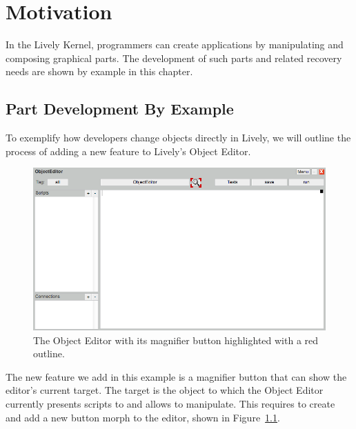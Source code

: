 \chapter{Motivation} \label{chapter:MOTIVATION}

In the Lively Kernel, programmers can create applications by manipulating and composing graphical parts.
The development of such parts and related recovery needs are shown by example in this chapter.

\section{Part Development By Example}

To exemplify how developers change objects directly in Lively, we will outline the process of adding a new feature to Lively's Object Editor.

\begin{figure}[h]
    \centering
    \includegraphics[width=\textwidth]{figures/3_motivation/1_magnifierButton.png}
    \caption{The Object Editor with its magnifier button highlighted with a red outline.}
    \label{fig:MagnifierButton}
\end{figure}

The new feature we add in this example is a magnifier button that can show the editor's current target.
The target is the object to which the Object Editor currently presents scripts to and allows to manipulate.
This requires to create and add a new button morph to the editor, shown in Figure~\ref{fig:MagnifierButton}.

